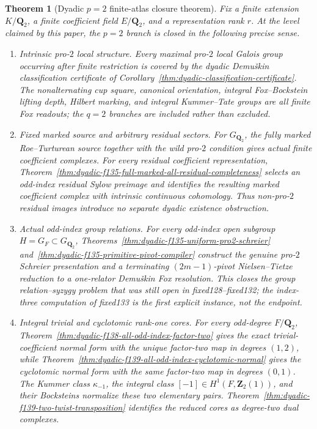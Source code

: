 \documentclass[11pt]{article}
\newtheorem{theorem}{Theorem}[section]
\theoremstyle{definition}
\begin{document}
\begin{theorem}[Dyadic $p=2$ finite-atlas closure theorem]
\label{thm:dyadic-f140-closure}
Fix a finite extension $K/\mathbf Q_2$, a finite
coefficient field $E/\mathbf Q_2$, and a representation
rank $r$.  At the level claimed by this paper, the
$p=2$ branch is closed in the following precise sense.

\begin{enumerate}[label=\textnormal{(\roman*)}]
\item \emph{Intrinsic pro-$2$ local structure.}
Every maximal pro-$2$ local Galois group occurring after
finite restriction is covered by the dyadic
Demu\v{s}kin classification certificate of
Corollary~\ref{thm:dyadic-classification-certificate}.
The nonalternating cup square, canonical orientation,
integral Fox--Bockstein lifting depth, Hilbert marking,
and integral Kummer--Tate groups are all finite Fox
readouts; the $q=2$ branches are included rather than
excluded.

\item \emph{Fixed marked source and arbitrary residual sectors.}
For $G_{\mathbf Q_2}$, the fully marked
Roe--Turturean source together with the wild pro-$2$
condition gives actual finite coefficient complexes.
For every residual coefficient representation,
Theorem~\ref{thm:dyadic-f135-full-marked-all-residual-completeness}
selects an odd-index residual Sylow preimage and identifies
the resulting marked coefficient complex with intrinsic
continuous cohomology.  Thus non-pro-$2$ residual images
introduce no separate dyadic existence obstruction.

\item \emph{Actual odd-index group relations.}
For every odd-index open subgroup
$H=G_F\subset G_{\mathbf Q_2}$,
Theorems~\ref{thm:dyadic-f135-uniform-pro2-schreier}
and~\ref{thm:dyadic-f135-primitive-pivot-compiler}
construct the genuine pro-$2$ Schreier presentation and
a terminating $(2m-1)$-pivot Nielsen--Tietze reduction to
a one-relator Demu\v{s}kin Fox resolution.  This closes
the group relation--syzygy problem that was still open in
fixed128--fixed132; the index-three computation of
fixed133 is the first explicit instance, not the endpoint.

\item \emph{Integral trivial and cyclotomic rank-one cores.}
For every odd-degree $F/\mathbf Q_2$,
Theorem~\ref{thm:dyadic-f138-all-odd-index-factor-two}
gives the exact trivial-coefficient normal form with the
unique factor-two map in degrees $(1,2)$, while
Theorem~\ref{thm:dyadic-f139-all-odd-index-cyclotomic-normal}
gives the cyclotomic normal form with the same factor-two
map in degrees $(0,1)$.
The Kummer class $\kappa_{-1}$, the integral class
$[-1]\in H^1(F,\mathbf Z_2(1))$, and their Bocksteins
normalize these two elementary pairs.
Theorem~\ref{thm:dyadic-f139-two-twist-transposition}
identifies the reduced cores as degree-two dual complexes.


\end{enumerate}
\end{theorem}
\end{document}

